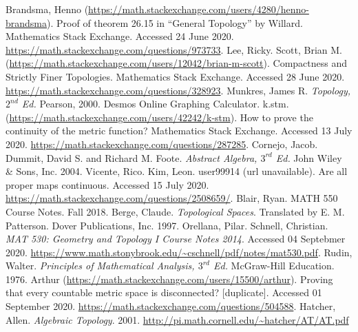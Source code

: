 \documentclass[12pt]{article}
\newcommand{\ita}[1]{\textit{#1}}
\theoremstyle{definition}
\begin{document}
\newpage
{}
{}
\begin{thebibliography}{99}
     Brandsma, Henno (\url{https://math.stackexchange.com/users/4280/henno-brandsma}). Proof of theorem 26.15 in ``General Topology'' by Willard. Mathematics Stack Exchange. Accessed 24 June 2020. \url{https://math.stackexchange.com/questions/973733}.
     Lee, Ricky.
     Scott, Brian M. (\url{https://math.stackexchange.com/users/12042/brian-m-scott}). Compactness and Strictly Finer Topologies. Mathematics Stack Exchange. Accessed 28 June 2020. \url{https://math.stackexchange.com/questions/328923}.
     Munkres, James R. \ita{Topology, $2^{nd}$ Ed.} Pearson, 2000.
     Desmos Online Graphing Calculator.
     k.stm. (\url{https://math.stackexchange.com/users/42242/k-stm}). How to prove the continuity of the metric function? Mathematics Stack Exchange. Accessed 13 July 2020. \url{https://math.stackexchange.com/questions/287285}.
     Cornejo, Jacob.
     Dummit, David S. and Richard M. Foote. \ita{Abstract Algebra, $3^{rd}$ Ed.} John Wiley \& Sons, Inc. 2004.
     Vicente, Rico.
     Kim, Leon.
     user99914 (url unavailable). Are all proper maps continuous. Accessed 15 July 2020. \url{https://math.stackexchange.com/questions/2508659/}.
     Blair, Ryan. MATH 550 Course Notes. Fall 2018.
     Berge, Claude. \ita{Topological Spaces}. Translated by E. M. Patterson. Dover Publications, Inc. 1997.
     Orellana, Pilar.
     Schnell, Christian. \ita{MAT 530: Geometry and Topology I Course Notes 2014}. Accessed 04 Septebmer 2020. \url{https://www.math.stonybrook.edu/~cschnell/pdf/notes/mat530.pdf}.  
     Rudin, Walter. \ita{Principles of Mathematical Analysis, $3^{rd}$ Ed.} McGraw-Hill Education. 1976.
     Arthur (\url{https://math.stackexchange.com/users/15500/arthur}). Proving that every countable metric space is disconnected? [duplicate]. Accessed 01 September 2020. \url{https://math.stackexchange.com/questions/504588}.
     Hatcher, Allen.
    \ita{Algebraic Topology}. 2001. \url{http://pi.math.cornell.edu/~hatcher/AT/AT.pdf}
\end{thebibliography}
\end{document}
